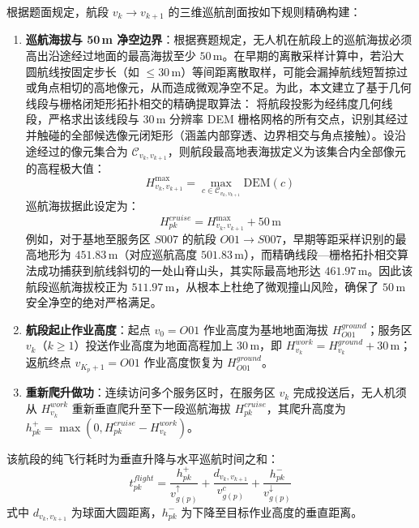 \documentclass[withoutpreface,bwprint]{format}
\begin{document}
根据题面规定，航段 $v_k \to v_{k+1}$ 的三维巡航剖面按如下规则精确构建：
\begin{enumerate}[leftmargin=*]
    \item \textbf{巡航海拔与 50\,m 净空边界}：根据赛题规定，无人机在航段上的巡航海拔必须高出沿途经过地面的最高海拔至少 $50\,\text{m}$。在早期的离散采样计算中，若沿大圆航线按固定步长（如 $\le 30\,\text{m}$）等间距离散取样，可能会漏掉航线短暂掠过或角点相切的高地像元，从而造成微观净空不足。为此，本文建立了基于几何线段与栅格闭矩形拓扑相交的精确提取算法：
    将航段投影为经纬度几何线段，严格求出该线段与 30\,m 分辨率 DEM 栅格网格的所有交点，识别其经过并触碰的全部候选像元闭矩形（涵盖内部穿透、边界相交与角点接触）。设沿途经过的像元集合为 $\mathcal{C}_{v_k, v_{k+1}}$，则航段最高地表海拔定义为该集合内全部像元的高程极大值：
    \begin{equation}
    H_{v_k, v_{k+1}}^{\max} = \max_{c \in \mathcal{C}_{v_k, v_{k+1}}} \text{DEM}(c)
    \end{equation}
    巡航海拔据此设定为：
    \begin{equation}
    H_{pk}^{cruise} = H_{v_k, v_{k+1}}^{\max} + 50\,\text{m}
    \end{equation}
    例如，对于基地至服务区 $S007$ 的航段 $O01 \to S007$，早期等距采样识别的最高地形为 $451.83\,\text{m}$（对应巡航高度 $501.83\,\text{m}$），而精确线段—栅格拓扑相交算法成功捕获到航线斜切的一处山脊山头，其实际最高地形达 $461.97\,\text{m}$。因此该航段巡航海拔校正为 $511.97\,\text{m}$，从根本上杜绝了微观撞山风险，确保了 $50\,\text{m}$ 安全净空的绝对严格满足。
    \item \textbf{航段起止作业高度}：起点 $v_0 = O01$ 作业高度为基地地面海拔 $H_{O01}^{ground}$；服务区 $v_k$（$k \ge 1$）投送作业高度为地面高程加上 $30\,\text{m}$，即 $H_{v_k}^{work} = H_{v_k}^{ground} + 30\,\text{m}$；返航终点 $v_{K_p+1} = O01$ 作业高度恢复为 $H_{O01}^{ground}$。
    \item \textbf{重新爬升做功}：连续访问多个服务区时，在服务区 $v_k$ 完成投送后，无人机须从 $H_{v_k}^{work}$ 重新垂直爬升至下一段巡航海拔 $H_{pk}^{cruise}$，其爬升高度为 $h_{pk}^+ = \max(0, H_{pk}^{cruise} - H_{v_k}^{work})$。
\end{enumerate}

该航段的纯飞行耗时为垂直升降与水平巡航时间之和：
\begin{equation}
t_{pk}^{flight} = \frac{h_{pk}^+}{v_{g(p)}^\uparrow} + \frac{d_{v_k, v_{k+1}}}{v_{g(p)}^c} + \frac{h_{pk}^-}{v_{g(p)}^\downarrow}
\end{equation}
式中 $d_{v_k, v_{k+1}}$ 为球面大圆距离，$h_{pk}^-$ 为下降至目标作业高度的垂直距离。
\end{document}
